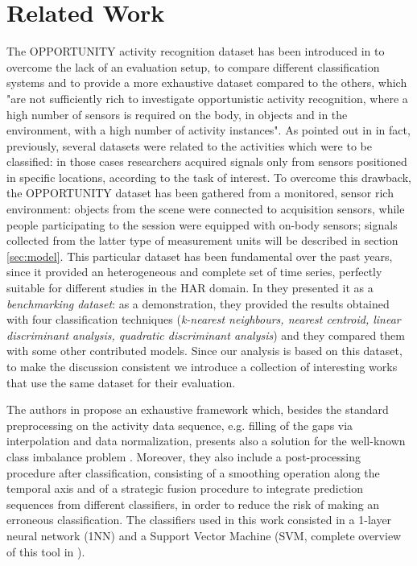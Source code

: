
\section{Related Work}
\label{sec:related_work}
The OPPORTUNITY activity recognition dataset has been introduced in \cite{ComplexAct-2010} to overcome the lack of an evaluation setup, to compare different classification systems and to provide a more exhaustive dataset compared to the others, which  "are not sufficiently rich to investigate opportunistic activity recognition, where a high number of sensors is required on the body, in objects and in the environment, with a high number of activity instances". As pointed out in \cite{Chavarriaga2013} in fact, previously, several datasets were related to the activities which were to be classified: in those cases researchers acquired signals only from sensors positioned in specific locations, according to the task of interest.
To overcome this drawback, the OPPORTUNITY dataset has been gathered from a monitored, sensor rich environment: objects from the scene were connected to acquisition sensors, while people participating to the session were equipped with on-body sensors; signals collected from the latter type of measurement units will be described in section \ref{sec:model}. This particular dataset has been fundamental over the past years, since it provided an heterogeneous and complete set of time series, perfectly suitable for different studies in the HAR domain. In \cite{Chavarriaga2013} they presented it as a \textit{benchmarking dataset}: as a demonstration, they provided the results obtained with four classification techniques (\textit{k-nearest neighbours, nearest centroid, linear discriminant analysis, quadratic discriminant analysis}) and they compared them with some other contributed models. Since our analysis is based on this dataset, to make the discussion consistent we introduce a collection of interesting works that use the same dataset for their evaluation.

The authors in \cite{cao2012integrated} propose an exhaustive framework which, besides the standard preprocessing on the activity data sequence, e.g. filling of the gaps via interpolation and data normalization, presents also a solution for the well-known class imbalance problem \cite{japkowicz2002class}. Moreover, they also include a post-processing procedure after classification, consisting of a smoothing operation along the temporal axis and of a strategic fusion procedure to integrate prediction sequences from different classifiers, in order to reduce the risk of making an erroneous classification. The classifiers used in this work consisted in a 1-layer neural network (1NN) and a Support Vector Machine (SVM, complete overview of this tool in \cite{hearst1998support}). 

